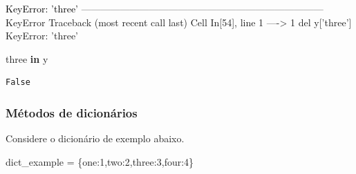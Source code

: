 \documentclass[
  brazilian,
  letterpaper,
  DIV=11,
  numbers=noendperiod]{scrreprt}
\newenvironment{Shaded}{\begin{snugshade}}{\end{snugshade}}
\newcommand{\CommentTok}[1]{\textcolor[rgb]{0.37,0.37,0.37}{#1}}
\newcommand{\DecValTok}[1]{\textcolor[rgb]{0.68,0.00,0.00}{#1}}
\newcommand{\KeywordTok}[1]{\textcolor[rgb]{0.00,0.23,0.31}{\textbf{#1}}}
\newcommand{\NormalTok}[1]{\textcolor[rgb]{0.00,0.23,0.31}{#1}}
\newcommand{\OperatorTok}[1]{\textcolor[rgb]{0.37,0.37,0.37}{#1}}
\newcommand{\StringTok}[1]{\textcolor[rgb]{0.13,0.47,0.30}{#1}}
\begin{document}
\begin{Highlighting}
\textcolor{black}{KeyError: 'three'}
\textcolor{black}{}\textcolor{QuartoInternalColor4}{---------------------------------------------------------------------------}\textcolor{QuartoInternalColor2}{}
\textcolor{QuartoInternalColor2}{}\textcolor{QuartoInternalColor4}{KeyError}\textcolor{QuartoInternalColor2}{                                  Traceback (most recent call last)}
\textcolor{QuartoInternalColor2}{}\textcolor{QuartoInternalColor1}{Cell}\textcolor{QuartoInternalColor2}{}\textcolor{QuartoInternalColor1}{ }\textcolor{QuartoInternalColor2}{}\textcolor{QuartoInternalColor3}{In[54]}\textcolor{QuartoInternalColor2}{}\textcolor{QuartoInternalColor3}{, line 1}\textcolor{QuartoInternalColor2}{}
\textcolor{QuartoInternalColor2}{}\textcolor{QuartoInternalColor3}{----> }\textcolor{QuartoInternalColor2}{}\textcolor{QuartoInternalColor3}{1}\textcolor{QuartoInternalColor2}{ }\textcolor{QuartoInternalColor7}{del}\textcolor{QuartoInternalColor2}{ }\textcolor{QuartoInternalColor2}{y}\textcolor{QuartoInternalColor2}{}\textcolor{QuartoInternalColor2}{[}\textcolor{QuartoInternalColor2}{}\textcolor{QuartoInternalColor2}{'}\textcolor{QuartoInternalColor2}{}\textcolor{QuartoInternalColor2}{three}\textcolor{QuartoInternalColor2}{}\textcolor{QuartoInternalColor2}{'}\textcolor{QuartoInternalColor2}{}\textcolor{QuartoInternalColor2}{]}\textcolor{QuartoInternalColor2}{}
\textcolor{QuartoInternalColor2}{}\textcolor{QuartoInternalColor4}{KeyError}\textcolor{QuartoInternalColor2}{: 'three'}
\end{Highlighting}

\begin{Shaded}
\begin{Highlighting}[]
\CommentTok{\textquotesingle{}three\textquotesingle{}} \KeywordTok{in}\NormalTok{ y}
\end{Highlighting}
\end{Shaded}

\begin{verbatim}
False
\end{verbatim}

\subsubsection{Métodos de
dicionários}\label{muxe9todos-de-dicionuxe1rios}

Considere o dicionário de exemplo abaixo.

\begin{Shaded}
\begin{Highlighting}[]
\NormalTok{dict\_example }\OperatorTok{=}\NormalTok{ \{}\StringTok{\textquotesingle{}one\textquotesingle{}}\NormalTok{:}\DecValTok{1}\NormalTok{,}\StringTok{\textquotesingle{}two\textquotesingle{}}\NormalTok{:}\DecValTok{2}\NormalTok{,}\StringTok{\textquotesingle{}three\textquotesingle{}}\NormalTok{:}\DecValTok{3}\NormalTok{,}\StringTok{\textquotesingle{}four\textquotesingle{}}\NormalTok{:}\DecValTok{4}\NormalTok{\}}
\end{Highlighting}
\end{Shaded}
\end{document}
